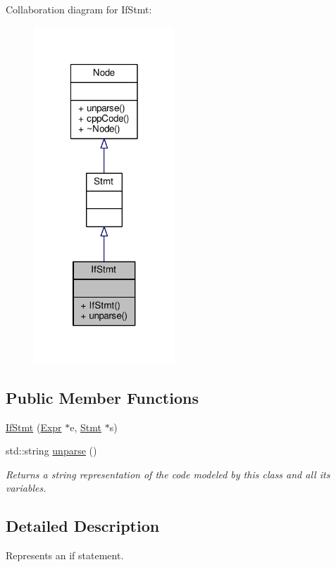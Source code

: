 Collaboration diagram for If\-Stmt\-:\nopagebreak
\begin{figure}[H]
\begin{center}
\leavevmode
\includegraphics[width=150pt]{classIfStmt__coll__graph}
\end{center}
\end{figure}
\subsection*{Public Member Functions}
\begin{DoxyCompactItemize}
\item 
\hyperlink{classIfStmt_a917206365fb4307ede6751d2d00e0a58}{If\-Stmt} (\hyperlink{classExpr}{Expr} $\ast$e, \hyperlink{classStmt}{Stmt} $\ast$s)
\item 
std\-::string \hyperlink{classIfStmt_abc1ada72841299826de65fbdf5dc36a0}{unparse} ()
\begin{DoxyCompactList}\small\item\em Returns a string representation of the code modeled by this class and all its variables. \end{DoxyCompactList}\end{DoxyCompactItemize}


\subsection{Detailed Description}
Represents an if statement. \par
 

